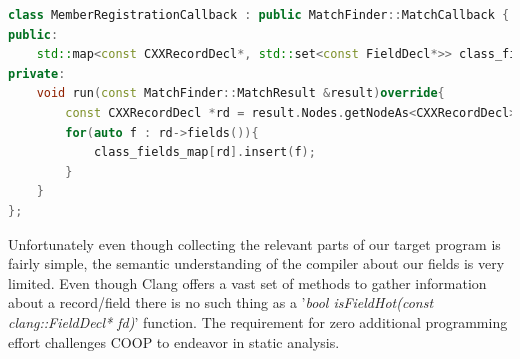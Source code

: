 \begin{lstlisting}[language=C++,name={Callback definition to register the records' members}, label={member_registration_callback}]
class MemberRegistrationCallback : public MatchFinder::MatchCallback {
public:
	std::map<const CXXRecordDecl*, std::set<const FieldDecl*>> class_fields_map;
private:
	void run(const MatchFinder::MatchResult &result)override{
		const CXXRecordDecl *rd = result.Nodes.getNodeAs<CXXRecordDecl>("record_binding");
		for(auto f : rd->fields()){		
			class_fields_map[rd].insert(f);
		}
	}
};
\end{lstlisting}
Unfortunately even though collecting the relevant parts of our target program is fairly simple, the semantic understanding of the compiler about our fields is very limited. Even though Clang offers a vast set of methods to gather information about a record/field there is no such thing as a '\textit{bool isFieldHot(const clang::FieldDecl* fd)}' function. The requirement for zero additional programming effort challenges COOP to endeavor in static analysis.

